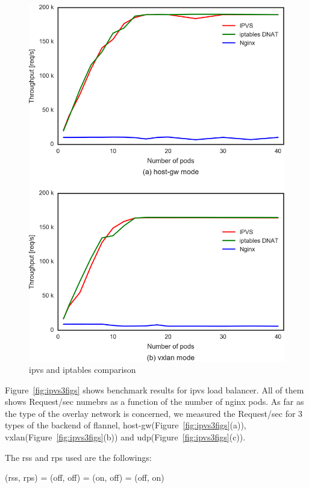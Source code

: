 \begin{figure}
\includegraphics[width=\columnwidth]{Figs/ipvs-iptables-nginx_2figs}
\caption{ipvs and iptables comparison}
\label{fig:ipvs-iptables-nginx_2figs}
\end{figure}

Figure~\ref{fig:ipvs3figs} shows benchmark results for ipvs load balancer. 
All of them shows Request/sec numebrs as a function of the number of nginx pods.
As far as the type of the overlay network is concerned, we measured the Request/sec for 3 types of the backend of flannel, 
host-gw(Figure~\ref{fig:ipvs3figs}(a)), vxlan(Figure~\ref{fig:ipvs3figs}(b)) and udp(Figure~\ref{fig:ipvs3figs}(c)).

The rss and rps used are the followings: 
\begin{verbatime}
(rss, rps) = (off, off)
           = (on,  off)
           = (off, on)
\end{verbatime}


